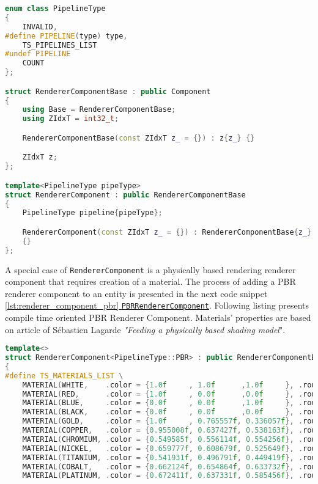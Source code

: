 \begin{itemize}
\begin{lstlisting}[language=c++, caption=\texttt{RendererComponent} struct (./engine/include/tsengine/ecs/components/renderer\_component.h)]
enum class PipelineType
{
    INVALID,
#define PIPELINE(type) type, 
    TS_PIPELINES_LIST
#undef PIPELINE
    COUNT
};

struct RendererComponentBase : public Component
{
    using Base = RendererComponentBase;
    using ZIdxT = int32_t;

    RendererComponentBase(const ZIdxT z_ = {}) : z{z_} {}

    ZIdxT z;
};

template<PipelineType pipeType>
struct RendererComponent : public RendererComponentBase 
{
    PipelineType pipeline{pipeType};

    RendererComponent(const ZIdxT z_ = {}) : RendererComponentBase{z_}
    {}
};
\end{lstlisting}

A special case of \texttt{RendererComponent} is a physically based rendering renderer component that requires creation of a material.
The process of adding a PBR renderer component to an entity is presented in the next code snippet \hyperref[lst:renderer_component_pbr]{\ref*{lst:renderer_component_pbr} \texttt{PBRRendererComponent}}.
Following listing presents compile time oriented PBR Renderer Component. Materials' properties are based on article of Sébastien Lagarde \textit{"Feeding a physically based shading model}"\cite{feedingpbr}.
\label{lst:renderer_component_pbr}
\begin{lstlisting}[language=c++, caption=Renderer PBR component struct (./engine/include/tsengine/ecs/components/renderer\_component.h)]
template<>
struct RendererComponent<PipelineType::PBR> : public RendererComponentBase
{
#define TS_MATERIALS_LIST \
    MATERIAL(WHITE,    .color = {1.0f     , 1.0f      ,1.0f     }, .roughness = 0.5f, .metallic = 1.0f) \
    MATERIAL(RED,      .color = {1.0f     , 0.0f      ,0.0f     }, .roughness = 0.5f, .metallic = 1.0f) \
    MATERIAL(BLUE,     .color = {0.0f     , 0.0f      ,1.0f     }, .roughness = 0.5f, .metallic = 1.0f) \
    MATERIAL(BLACK,    .color = {0.0f     , 0.0f      ,0.0f     }, .roughness = 0.5f, .metallic = 1.0f) \
    MATERIAL(GOLD,     .color = {1.0f     , 0.765557f, 0.336057f}, .roughness = 0.5f, .metallic = 1.0f) \
    MATERIAL(COPPER,   .color = {0.955008f, 0.637427f, 0.538163f}, .roughness = 0.5f, .metallic = 1.0f) \
    MATERIAL(CHROMIUM, .color = {0.549585f, 0.556114f, 0.554256f}, .roughness = 0.5f, .metallic = 1.0f) \
    MATERIAL(NICKEL,   .color = {0.659777f, 0.608679f, 0.525649f}, .roughness = 0.5f, .metallic = 1.0f) \
    MATERIAL(TITANIUM, .color = {0.541931f, 0.496791f, 0.449419f}, .roughness = 0.5f, .metallic = 1.0f) \
    MATERIAL(COBALT,   .color = {0.662124f, 0.654864f, 0.633732f}, .roughness = 0.5f, .metallic = 1.0f) \
    MATERIAL(PLATINUM, .color = {0.672411f, 0.637331f, 0.585456f}, .roughness = 0.5f, .metallic = 1.0f) \


\end{lstlisting}
\end{itemize}
